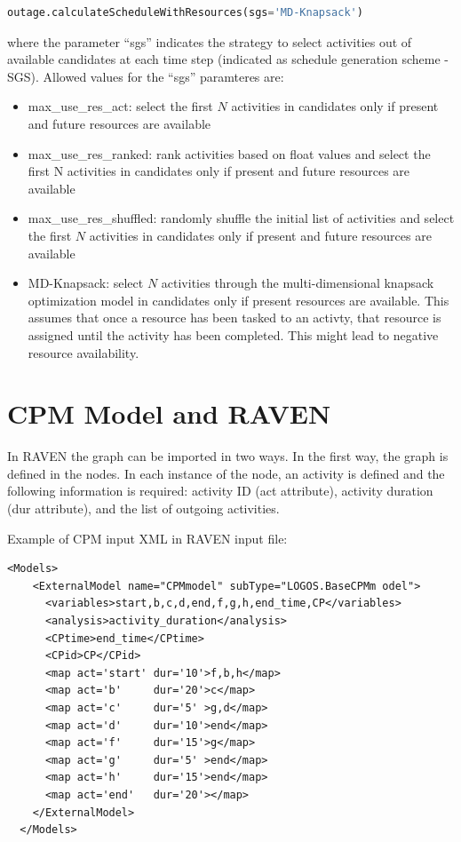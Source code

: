 \begin{lstlisting}[language=Python]
outage.calculateScheduleWithResources(sgs='MD-Knapsack')
\end{lstlisting}

where the parameter ``sgs'' indicates the strategy to select activities out of available candidates at each time step
(indicated as schedule generation scheme - SGS).
Allowed values for the ``sgs'' paramteres are:
\begin{itemize}
  \item max_use_res_act: select the first $N$ activities in candidates only if present and future resources are available
  \item max_use_res_ranked: rank activities based on float values and select the first N activities in candidates only if 
                            present and future resources are available
  \item max_use_res_shuffled: randomly shuffle the initial list of activities and select the first $N$ activities in candidates 
                              only if present and future resources are available
  \item MD-Knapsack: select $N$ activities through the multi-dimensional knapsack optimization model in candidates only if 
                     present resources are available. This assumes that once a resource has been tasked to an activty, that 
                     resource is assigned until the activity has been completed. This might lead to negative resource availability.
\end{itemize}

\section{CPM Model and RAVEN}
\label{sec:CPM_RAVEN}

In RAVEN the graph can be imported in two ways. In the first way, the graph is defined in the
 nodes. In each instance of the  node, an activity is defined and the
following information is required: activity ID (act attribute), activity duration (dur attribute),
and the list of outgoing activities.

Example of CPM input XML in RAVEN input file:
\begin{lstlisting}[style=XML]
  <Models>
    <ExternalModel name="CPMmodel" subType="LOGOS.BaseCPMm odel">
      <variables>start,b,c,d,end,f,g,h,end_time,CP</variables>
      <analysis>activity_duration</analysis> 
      <CPtime>end_time</CPtime>
      <CPid>CP</CPid>
      <map act='start' dur='10'>f,b,h</map>
      <map act='b'     dur='20'>c</map>
      <map act='c'     dur='5' >g,d</map>
      <map act='d'     dur='10'>end</map>
      <map act='f'     dur='15'>g</map>
      <map act='g'     dur='5' >end</map>
      <map act='h'     dur='15'>end</map>
      <map act='end'   dur='20'></map>
    </ExternalModel>
  </Models>
\end{lstlisting}

